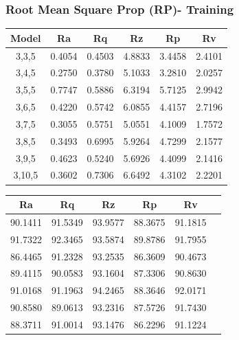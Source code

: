 \documentclass[suppldata]{interact}
\begin{document}
 \newpage 
\begin {landscape}
\subsubsection{ Root Mean Square Prop (RP)- Training}
  \begin{minipage}{0.35\textwidth}
  \small
 \centering
    \begin{tabular}{|c|c|c|c|c|c|}
    \hline
        Model & Ra &  Rq &  Rz &  Rp & Rv \\ \hline
        3,3,5 & 0.4054 & 0.4503 & 4.8833 & 3.4458 & 2.4101 \\ \hline
        3,4,5 & 0.2750 & 0.3780 & 5.1033 & 3.2810 & 2.0257 \\ \hline
        3,5,5 & 0.7747 & 0.5886 & 6.3194 & 5.7125 & 2.9942 \\ \hline
        3,6,5 & 0.4220 & 0.5742 & 6.0855 & 4.4157 & 2.7196 \\ \hline
        3,7,5 & 0.3055 & 0.5751 & 5.0551 & 4.1009 & 1.7572 \\ \hline
        3,8,5 & 0.3493 & 0.6995 & 5.9264 & 4.7299 & 2.1577 \\ \hline
        3,9,5 & 0.4623 & 0.5240 & 5.6926 & 4.4099 & 2.1416 \\ \hline
        3,10,5 & 0.3602 & 0.7306 & 6.6492 & 4.3102 & 2.2201 \\ \hline
    \end{tabular}
        \label{tab:rpmsetr}
    \end{minipage}
   \hfill
   \begin{minipage}{0.30\textwidth}
   \small
\centering
    \centering
      \begin{tabular}{|c|c|c|c|c|c|}
    \hline
         Ra &  Rq &  Rz &  Rp & Rv \\ \hline
        90.1411 & 91.5349 & 93.9577 & 88.3675 & 91.1815 \\ \hline
        91.7322 & 92.3465 & 93.5874 & 89.8786 & 91.7955 \\ \hline
        86.4465 & 91.2328 & 93.2535 & 86.3609 & 90.4673 \\ \hline
        89.4115 & 90.0583 & 93.1604 & 87.3306 & 90.8630 \\ \hline
        91.0168 & 91.1963 & 94.2465 & 88.3646 & 92.0171 \\ \hline
        90.8580 & 89.0613 & 93.2316 & 87.5726 & 91.7430 \\ \hline
        88.3711 & 91.0014 & 93.1476 & 86.2296 & 91.1224 \\ \hline

\end{tabular}
\end{minipage}
\end{landscape}
\end{document}
